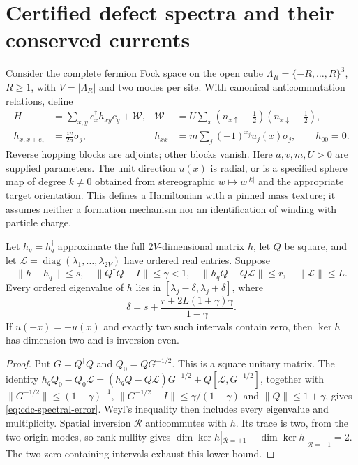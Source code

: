 \section{Certified defect spectra and their conserved currents}
\label{sec:certified-defect-currents}

Consider the complete fermion Fock space on the open cube
$\Lambda_R=\{-R,\ldots,R\}^3$, $R\geq1$, with $V=|\Lambda_R|$ and two
modes per site.  With canonical anticommutation relations, define
\begin{align}
 H&=\sum_{x,y}c_x^\dagger h_{xy}c_y+\mathcal W,
 &\mathcal W&=U\sum_x(n_{x\uparrow}-\tfrac12)
                         (n_{x\downarrow}-\tfrac12),\label{eq:cdc-source}\\
 h_{x,x+e_j}&=\frac{iv}{2a}\sigma_j,
 &h_{xx}&=m\sum_j(-1)^{x_j}u_j(x)\sigma_j,\qquad h_{00}=0.
 \nonumber
\end{align}
Reverse hopping blocks are adjoints; other blocks vanish.
Here $a,v,m,U>0$ are supplied parameters.  The unit direction $u(x)$ is
radial, or is a specified sphere map of degree $k\neq0$ obtained from
stereographic $w\mapsto w^{|k|}$ and the appropriate target orientation.
This defines a Hamiltonian with a pinned mass texture; it assumes neither
a formation mechanism nor an identification of winding with particle charge.

\begin{proposition}
\label{prop:cdc-spectral-certificate}
Let $h_q=h_q^\dagger$ approximate the full $2V$-dimensional matrix $h$,
let $Q$ be square, and let $\mathcal L=\operatorname{diag}(\lambda_1,
\ldots,\lambda_{2V})$ have ordered real entries.  Suppose
\[
 \|h-h_q\|\leq s,\quad
 \|Q^\dagger Q-I\|\leq\gamma<1,\quad
 \|h_qQ-Q\mathcal L\|\leq r,\quad \|\mathcal L\|\leq L.
\]
Every ordered eigenvalue of $h$ lies in $[\lambda_j-\delta,\lambda_j+\delta]$,
where
\begin{equation}
 \delta=s+\frac{r+2L(1+\gamma)\gamma}{1-\gamma}.
 \label{eq:cdc-spectral-error}
\end{equation}
If $u(-x)=-u(x)$ and exactly two such intervals contain zero, then
$\ker h$ has dimension two and is inversion-even.
\end{proposition}
\begin{proof}
Put $G=Q^\dagger Q$ and $Q_0=QG^{-1/2}$.  This is a square unitary matrix.
The identity
$h_qQ_0-Q_0\mathcal L=(h_qQ-Q\mathcal L)G^{-1/2}
+Q[\mathcal L,G^{-1/2}]$, together with
$\|G^{-1/2}\|\leq(1-\gamma)^{-1}$,
$\|G^{-1/2}-I\|\leq\gamma/(1-\gamma)$ and $\|Q\|\leq1+\gamma$,
gives \eqref{eq:cdc-spectral-error}.  Weyl's inequality then includes every
eigenvalue and multiplicity.  Spatial inversion $\mathcal R$ anticommutes
with $h$.  Its trace is two, from the two origin modes, so rank-nullity gives
$\dim\ker h|_{\mathcal R=+1}-\dim\ker h|_{\mathcal R=-1}=2$.
The two zero-containing intervals exhaust this lower bound.
\end{proof}

